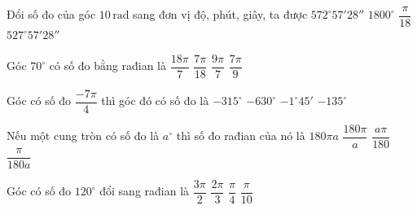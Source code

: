 

\begin{ex}%
	Đổi số đo của góc $10\,\mathrm{rad}$ sang đơn vị độ, phút, giây,  ta được
	\choice 
		{\True $572^\circ  57'28''$}
		 {$1800^\circ$}
		 {$\dfrac{\pi}{18}$}
		{$527^\circ 57'28''$} 
\end{ex}

\begin{ex}%
	Góc $70^\circ$ có số đo bằng rađian là 
	\choice 
		{$\dfrac{18\pi}{7}$} 
		{\True  $\dfrac{7\pi}{18}$}
		{$\dfrac{9\pi}{7}$} 
		 {$\dfrac{7\pi}{9}$}
\end{ex}

\begin{ex}%
	 Góc có số đo $\dfrac{-7\pi}{4}$ thì góc đó có số đo là
	\choice 
		 {\True $-315^\circ$}
		 {$-630^\circ$}
		{$-1^\circ  45'$}
		 {$-135^\circ$}
\end{ex}

\begin{ex}%
	Nếu  một cung tròn có số đo là $a^\circ$ thì số đo rađian của nó là
	\choice 
		{$180\pi  a$}
		{$\dfrac{180\pi}{a}$} 
		{\True $\dfrac{a\pi}{180}$} 
		 {$\dfrac{\pi}{180a}$}
\end{ex}

\begin{ex}%
	Góc có số đo $120^\circ$ đổi sang  rađian là
	 \choice
		 {$\dfrac{3\pi}{2}$}
		{\True $\dfrac{2\pi}{3}$} 
		{$\dfrac{\pi}{4}$} 
		{$\dfrac{\pi}{10}$} 
\end{ex}

